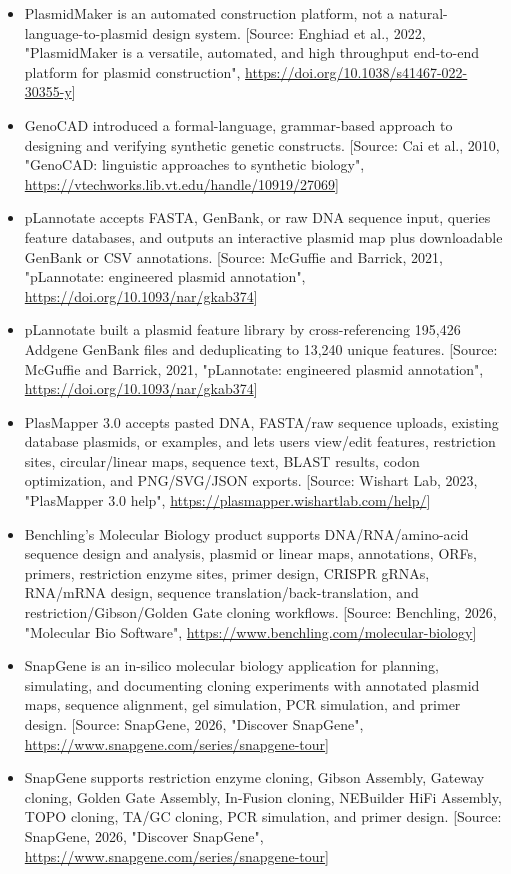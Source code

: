 \documentclass[11pt]{report}
\begin{document}
\begin{itemize}
\item PlasmidMaker is an automated construction platform, not a natural-language-to-plasmid design system. [Source: Enghiad et al., 2022, "PlasmidMaker is a versatile, automated, and high throughput end-to-end platform for plasmid construction", \url{https://doi.org/10.1038/s41467-022-30355-y}]
\item GenoCAD introduced a formal-language, grammar-based approach to designing and verifying synthetic genetic constructs. [Source: Cai et al., 2010, "GenoCAD: linguistic approaches to synthetic biology", \url{https://vtechworks.lib.vt.edu/handle/10919/27069}]
\item pLannotate accepts FASTA, GenBank, or raw DNA sequence input, queries feature databases, and outputs an interactive plasmid map plus downloadable GenBank or CSV annotations. [Source: McGuffie and Barrick, 2021, "pLannotate: engineered plasmid annotation", \url{https://doi.org/10.1093/nar/gkab374}]
\item pLannotate built a plasmid feature library by cross-referencing 195,426 Addgene GenBank files and deduplicating to 13,240 unique features. [Source: McGuffie and Barrick, 2021, "pLannotate: engineered plasmid annotation", \url{https://doi.org/10.1093/nar/gkab374}]
\item PlasMapper 3.0 accepts pasted DNA, FASTA/raw sequence uploads, existing database plasmids, or examples, and lets users view/edit features, restriction sites, circular/linear maps, sequence text, BLAST results, codon optimization, and PNG/SVG/JSON exports. [Source: Wishart Lab, 2023, "PlasMapper 3.0 help", \url{https://plasmapper.wishartlab.com/help/}]
\item Benchling's Molecular Biology product supports DNA/RNA/amino-acid sequence design and analysis, plasmid or linear maps, annotations, ORFs, primers, restriction enzyme sites, primer design, CRISPR gRNAs, RNA/mRNA design, sequence translation/back-translation, and restriction/Gibson/Golden Gate cloning workflows. [Source: Benchling, 2026, "Molecular Bio Software", \url{https://www.benchling.com/molecular-biology}]
\item SnapGene is an in-silico molecular biology application for planning, simulating, and documenting cloning experiments with annotated plasmid maps, sequence alignment, gel simulation, PCR simulation, and primer design. [Source: SnapGene, 2026, "Discover SnapGene", \url{https://www.snapgene.com/series/snapgene-tour}]
\item SnapGene supports restriction enzyme cloning, Gibson Assembly, Gateway cloning, Golden Gate Assembly, In-Fusion cloning, NEBuilder HiFi Assembly, TOPO cloning, TA/GC cloning, PCR simulation, and primer design. [Source: SnapGene, 2026, "Discover SnapGene", \url{https://www.snapgene.com/series/snapgene-tour}]

\end{itemize}
\end{document}
